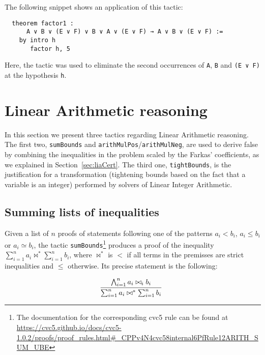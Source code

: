The following snippet shows an application of this tactic:

\begin{verbatim}
  theorem factor1 :
      A ∨ B ∨ (E ∨ F) ∨ B ∨ A ∨ (E ∨ F) → A ∨ B ∨ (E ∨ F) :=
    by intro h
       factor h, 5
\end{verbatim}

Here, the tactic was used to eliminate the second occurrences of \texttt{A}, \texttt{B} and
\texttt{(E ∨ F)} at the hypothesis \texttt{h}.


\section{Linear Arithmetic reasoning}

In this section we present three tactics regarding Linear Arithmetic reasoning.
The first two, \texttt{sumBounds} and \texttt{arithMulPos}/\texttt{arithMulNeg},
are used to derive false by combining the inequalities in the problem scaled by
the Farkas' coefficients, as we explained in Section~\ref{sec:liaCert}.
The third one, \texttt{tightBounds}, is the justification for a transformation
(tightening bounds based on the fact that a variable is an integer)
performed by solvers of Linear Integer Arithmetic.

\subsection{Summing lists of inequalities}

Given a list of $n$ proofs of statements following one of the patterns $a_{i} < b_{i}$, $a_{i} \le b_{i}$ or $a_{i} \simeq b_{i}$,
the tactic \texttt{sumBounds}\footnote{The documentation for the corresponding cvc5 rule can be found at \url{https://cvc5.github.io/docs/cvc5-1.0.2/proofs/proof\_rules.html\#\_CPPv4N4cvc58internal6PfRule12ARITH\_SUM\_UBE}}
produces a proof of the inequality $\sum_{i = 1}^{n} a_{i} \bowtie^{*} \sum_{i = 1}^{n} b_{i}$, where $\bowtie^{*}$ is $<$ if
all terms in the premisses are strict inequalities and $\le$ otherwise. Its precise statement is the following:

\[
  \infer[]{\sum_{i = 1}^{n} a_{i} \bowtie^{*} \sum_{i = 1}^{n} b_{i}}{\bigwedge_{i = 1}^{n} a_{i} \bowtie_{i} b_{i}}
\]

